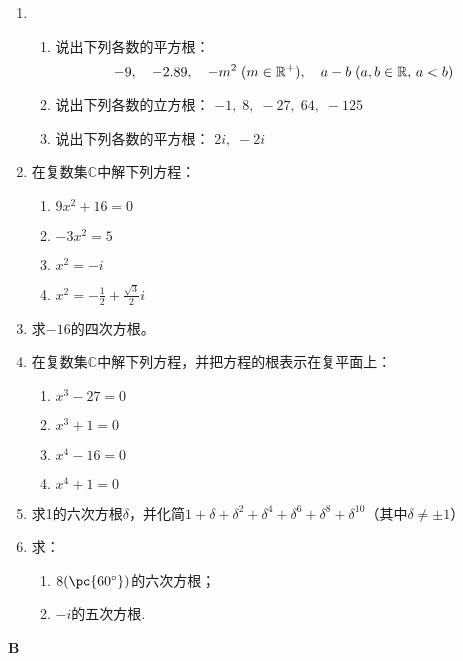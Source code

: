 \begin{enumerate}
    \item \begin{enumerate}[(1)]
        \item 说出下列各数的平方根：
        $$-9,\quad -2.89,\quad -m^2\; (m\in\mathbb{R}^+),\quad a-b\; (a,b\in\mathbb{R},\, a<b)$$
        \item 说出下列各数的立方根：
        $-1,\; 8,\; -27,\; 64,\; -125$
        \item 说出下列各数的平方根：
        $2i,\; -2i$
    \end{enumerate}
\item 在复数集$\mathbb{C}$中解下列方程：
\begin{multicols}{2}
\begin{enumerate}[(1)]
    \item $9x^2+16=0$
    \item $-3x^2=5$
    \item $x^2=-i$
    \item $x^2=-\frac{1}{2}+\frac{\sqrt{3}}{2}i$
\end{enumerate}
\end{multicols}
\item 求$-16$的四次方根。
\item 在复数集$\mathbb{C}$中解下列方程，并把方程的根表示在复平面上：
\begin{multicols}{2}
    \begin{enumerate}[(1)]
    \item $x^3-27=0$
    \item $x^3+1=0$
    \item $x^4-16=0$
    \item $x^4+1=0$
\end{enumerate}
\end{multicols}
\item 求1的六次方根$\delta$，并化简$1+\delta+\delta^2+\delta^4+\delta^6+\delta^8+\delta^{10}$（其中$\delta\ne \pm1$）

\item 求：
\begin{enumerate}[(1)]
    \item $8(\pc{60^{\circ}})$的六次方根；
    \item $-i$的五次方根.
\end{enumerate}
\end{enumerate}

\begin{center}
    \bfseries B
    \end{center}

